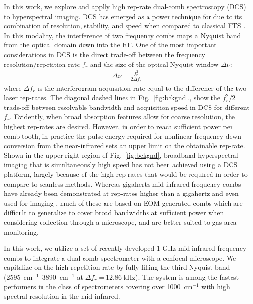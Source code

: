 \documentclass{optica-article}
\begin{document}
In this work, we explore and applly high rep-rate dual-comb spectroscopy (DCS) to hyperspectral imaging. DCS has emerged as a power technique for due to its combination of resolution, stability, and speed when compared to classical FTS \cite{coddingtonDualcombSpectroscopy2016}. In this modality, the interference of two frequency combs maps a Nyquist band from the optical domain down into the RF. One of the most important considerations in DCS is the direct trade-off between the frequency resolution/repetition rate $f_r$ and the size of the optical Nyquist window $\Delta \nu$:
% 
\begin{align}
    \Delta \nu = \frac{f_r^2}{2 \Delta f_r}
\end{align}
% 
where $\Delta f_r$ is the interferogram acquisition rate equal to the difference of the two laser rep-rates. The diagonal dashed lines in \mbox{Fig. \ref{fig:bckgnd}}., show the $f_r^2/2$ trade-off between resolvable bandwidth and acquisition speed in DCS for different $f_r$. Evidently, when broad absorption features allow for coarse resolution, the highest rep-rates are desired. However, in order to reach sufficient power per comb tooth, in practice the pulse energy required for nonlinear frequency down-conversion from the near-infrared sets an upper limit on the obtainable rep-rate. Shown in the upper right region of \mbox{Fig. \ref{fig:bckgnd}}, broadband hyperspectral imaging that is simultaneously high speed has not been achieved using a DCS platform, largely because of the high rep-rates that would be required in order to compare to scanless methods. Whereas gigahertz mid-infrared frequency combs have already been demonstrated at rep-rates higher than a gigahertz \cite{kowligyMidinfraredFrequencyCombs2020} and even used for imaging \cite{ullahkhanDirectHyperspectralDualcomb2020,khanSubGHzOpticalResolution2023}, much of these are based on EOM generated combs which are difficult to generalize to cover broad bandwidths at sufficient power when considering collection through a microscope, and are better suited to gas area monitoring. 

In this work, we utilize a set of recently developed 1-GHz mid-infrared frequency combs \cite{hoghooghiBroadband1GHzMidinfrared2022} to integrate a dual-comb spectrometer with a confocal microscope. We capitalize on the high repetition rate by fully filling the third Nyquist band (\mbox{2595 $\mathrm{cm^{-1}}$}--\mbox{3890 $\mathrm{cm^{-1}}$} at \mbox{$\Delta f_r=12.86 \; \text{kHz}$}). The system is among the fastest performers in the class of spectrometers covering over \mbox{1000 $\mathrm{cm^{-1}}$} with high spectral resolution in the mid-infrared.
\end{document}
